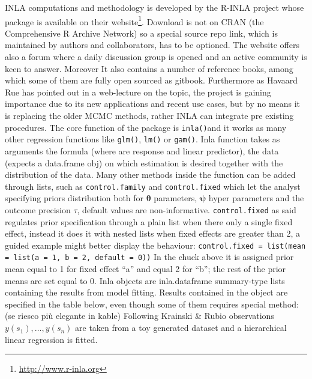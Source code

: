 \documentclass[
  12pt,
  a4paper,
  oneside]{book}
\newcommand{\passthrough}[1]{#1}
\DeclareRobustCommand{\href}[2]{#2\footnote{\url{#1}}}
\theoremstyle{definition}
\theoremstyle{definition}
\theoremstyle{definition}
\theoremstyle{remark}
\begin{document}
INLA computations and methodology is developed by the R-INLA project whose package is available on their \href{http://www.r-inla.org}{website}. Download is not on CRAN (the Comprehensive R Archive Network) so a special source repo link, which is maintained by authors and collaborators, has to be optioned. The website offers also a forum where a daily discussion group is opened and an active community is keen to answer. Moreover It also contains a number of reference books, among which some of them are fully open sourced as gitbook. Furthermore as Havaard Rue has pointed out in a web-lecture on the topic, the project is gaining importance due to its new applications and recent use cases, but by no means it is replacing the older MCMC methods, rather INLA can integrate pre existing procedures.
The core function of the package is \passthrough{\lstinline!inla()!}and it works as many other regression functions like \passthrough{\lstinline!glm()!}, \passthrough{\lstinline!lm()!} or \passthrough{\lstinline!gam()!}. Inla function takes as arguments the formula (where are response and linear predictor), the data (expects a data.frame obj) on which estimation is desired together with the distribution of the data. Many other methods inside the function can be added through lists, such as \passthrough{\lstinline!control.family!} and \passthrough{\lstinline!control.fixed!} which let the analyst specifying priors distribution both for \(\boldsymbol{\theta}\) parameters, \(\boldsymbol{\psi}\) hyper parameters and the outcome precision \(\tau\), default values are non-informative.
\passthrough{\lstinline!control.fixed!} as said regulates prior specification through a plain list when there only a single fixed effect, instead it does it with nested lists when fixed effects are greater than 2, a guided example might better display the behaviour:
\passthrough{\lstinline!control.fixed = list(mean = list(a = 1, b = 2, default = 0))!}
In the chuck above it is assigned prior mean equal to 1 for fixed effect ``a'' and equal 2 for ``b''; the rest of the prior means are set equal to 0.
Inla objects are inla.dataframe summary-type lists containing the results from model fitting. Results contained in the object are specified in the table below, even though some of them requires special method: (se riesco più elegante in kable)
Following Krainski \& Rubio \citeyearpar{Krainski-Rubio} observations \(y(s_{1}), \ldots, y(s_{n})\) are taken from a toy generated dataset and a hierarchical linear regression is fitted.
\end{document}
